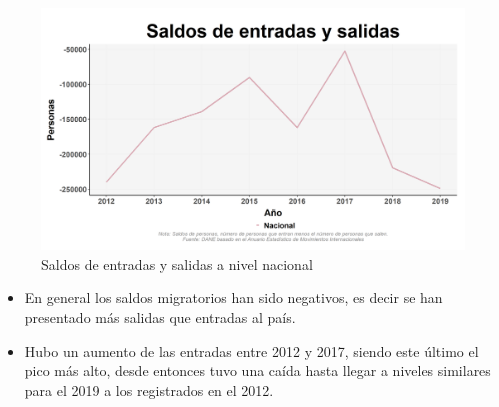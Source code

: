     \begin{figure}[H]
        \caption{Saldos de entradas y salidas a nivel nacional \label{map_result_2} }
        \begin{center}
        \includegraphics[width=\textwidth,keepaspectratio]{img/var_240_trend.png}
        \end{center}
    \end{figure}
            \begin{itemize}
                    \item En general los saldos migratorios han sido negativos, es decir se han presentado más salidas que entradas al país.
                    \item Hubo un aumento de las entradas entre 2012 y 2017, siendo este último el pico más alto, desde entonces tuvo una caída hasta llegar a niveles similares para el 2019 a los registrados en el 2012.
                    \end{itemize}

